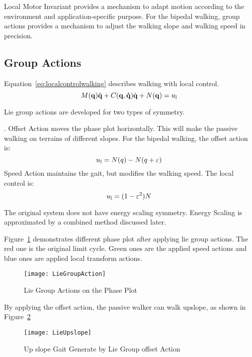 Local Motor Invariant provides a mechanism to adapt motion according to the environment and application-specific purpose. 
For the bipedal walking, group actions provides a mechanism to adjust the walking slope and walking speed in precision.




\subsection{Group Actions}

Equation~\ref{eq:localcontrolwalking} describes walking with local control.
\begin{equation}
\label{eq:localcontrolwalking}
M(\mathbf{q}) \ddot{\mathbf{q}} + C(\mathbf{q,\dot{q}})\dot{\mathbf{q}} + N(\mathbf{q}) = u_{\mathrm{l}}
\end{equation}




Lie group actions are developed for two types of symmetry.
\begin{itemize}

.
Offset Action moves the phase plot horizontally.
This will make the passive walking on terrains of different slopes.
For the bipedal walking, the offset action is:
\[
u_{\mathrm{l}}=N(q)-N(q+\varepsilon)
\]
Speed Action maintains the gait, but modifies the walking speed.
The local control is:
\[  
u_{\mathrm{l}}=(1-\varepsilon^2)N
\]
\end{itemize}

The original system does not have energy scaling symmetry.
Energy Scaling is approximated by a combined method discussed later.

Figure~\ref{fig:walkliegroupphase} demonstrates different phase plot after applying lie group actions.
The red one is the original limit cycle.
Green ones are the applied speed actions and blue ones are applied local transform actions.


\begin{figure}[!htbp]
  \begin{center}
     \texttt{[image: LieGroupAction]}
    \caption{Lie Group Actions on the Phase Plot}
    \label{fig:walkliegroupphase}
\end{center}
\end{figure}


By applying the offset action,   the passive walker can walk upslope, as shown in Figure~\ref{fig:liegroupupslope}
\begin{figure}[!htbp]
  \begin{center}
      \texttt{[image: LieUpslope]}
    \caption{Up slope Gait Generate by Lie Group offset Action}
    \label{fig:liegroupupslope}
\end{center}
\end{figure}

